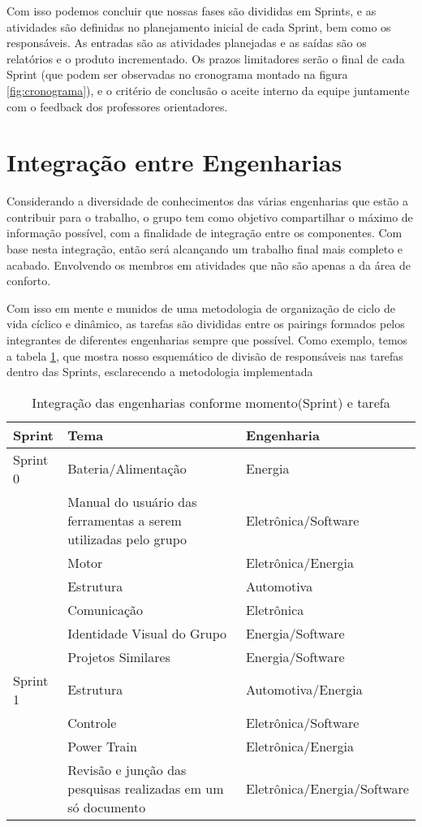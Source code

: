 Com isso podemos concluir que nossas fases são divididas em Sprints, e as atividades são definidas no planejamento inicial de cada Sprint, bem como os responsáveis. As entradas são as atividades planejadas e as saídas são os relatórios e o produto incrementado. Os prazos limitadores serão o final de cada Sprint (que podem ser observadas no cronograma montado na figura \ref{fig:cronograma}), e o critério de conclusão o aceite interno da equipe juntamente com o feedback dos professores orientadores.

\section{Integração entre Engenharias}

Considerando a diversidade de conhecimentos das várias engenharias que estão a contribuir para o trabalho, o grupo tem como objetivo  compartilhar o máximo de informação possível, com a finalidade de integração entre os componentes. Com base nesta integração, então será alcançando um trabalho final mais completo e acabado. Envolvendo os membros em atividades que não são apenas a da área de conforto.

Com isso em mente e munidos de uma metodologia de organização de ciclo de vida cíclico e dinâmico, as tarefas são divididas entre os pairings formados pelos integrantes de diferentes engenharias sempre que possível. Como exemplo, temos a tabela \ref{tab:integracao}, que mostra nosso esquemático de divisão de responsáveis nas tarefas dentro das Sprints, esclarecendo a metodologia implementada


\begin{table}[!ht]
\centering
\caption{Integração das engenharias conforme momento(Sprint) e tarefa}
\begin{tabular}{|p{2cm}|p{6cm}|p{5cm}|}
\hline
Sprint & Tema & Engenharia \\ \hline
Sprint 0 & Bateria/Alimentação & Energia \\ \hline
 & Manual do usuário das ferramentas a serem utilizadas pelo grupo & Eletrônica/Software \\ \hline
 & Motor & Eletrônica/Energia \\ \hline
 & Estrutura & Automotiva \\ \hline
 & Comunicação & Eletrônica \\ \hline
 & Identidade Visual do Grupo & Energia/Software \\ \hline
 & Projetos Similares & Energia/Software \\ \hline
Sprint 1 & Estrutura & Automotiva/Energia \\ \hline
 & Controle & Eletrônica/Software \\ \hline
 & Power Train & Eletrônica/Energia \\ \hline
 & Revisão e junção das pesquisas realizadas em um só documento & Eletrônica/Energia/Software \\ \hline
\end{tabular}
\label{tab:integracao}
\end{table}

